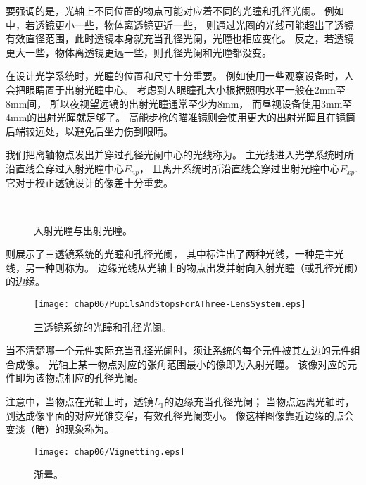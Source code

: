 要强调的是，光轴上不同位置的物点可能对应着不同的光瞳和孔径光阑。
例如中，若透镜更小一些，物体离透镜更近一些，
则通过光圈的光线可能超出了透镜有效直径范围，此时透镜本身就充当孔径光阑，光瞳也相应变化。
反之，若透镜更大一些，物体离透镜更远一些，则孔径光阑和光瞳都没变。

在设计光学系统时，光瞳的位置和尺寸十分重要。
例如使用一些观察设备时，人会把眼睛置于出射光瞳中心。
考虑到人眼瞳孔大小根据照明水平一般在2mm至8mm间，
所以夜视望远镜的出射光瞳通常至少为8mm，
而昼视设备使用3mm至4mm的出射光瞳就足够了。
高能步枪的瞄准镜则会使用更大的出射光瞳且在镜筒后端较远处，以避免后坐力伤到眼睛。

我们把离轴物点发出并穿过孔径光阑中心的光线称为。
主光线进入光学系统时所沿直线会穿过入射光瞳中心$E_{np}$，
且离开系统时所沿直线会穿过出射光瞳中心$E_{xp}$.
它对于校正透镜设计的像差十分重要。
\begin{figure}[htbp]
    \centering
    \\
    \caption{入射光瞳与出射光瞳。}
    \label{fig:6.49}
\end{figure}

则展示了三透镜系统的光瞳和孔径光阑，
其中标注出了两种光线，一种是主光线，另一种则称为。
边缘光线从光轴上的物点出发并射向入射光瞳（或孔径光阑）的边缘。
\begin{figure}[htbp]
    \centering\texttt{[image: chap06/PupilsAndStopsForAThree-LensSystem.eps]}
    \caption{三透镜系统的光瞳和孔径光阑。}
    \label{fig:6.50}
\end{figure}

当不清楚哪一个元件实际充当孔径光阑时，须让系统的每个元件被其左边的元件组合成像。
光轴上某一物点对应的张角范围最小的像即为入射光瞳。
该像对应的元件即为该物点相应的孔径光阑。

注意中，当物点在光轴上时，透镜$L_1$的边缘充当孔径光阑；
当物点远离光轴时，到达成像平面的对应光锥变窄，有效孔径光阑变小。
像这样图像靠近边缘的点会变淡（暗）的现象称为。
\begin{figure}[htbp]
    \centering\texttt{[image: chap06/Vignetting.eps]}
    \caption{渐晕。}
    \label{fig:6.51}
\end{figure}

